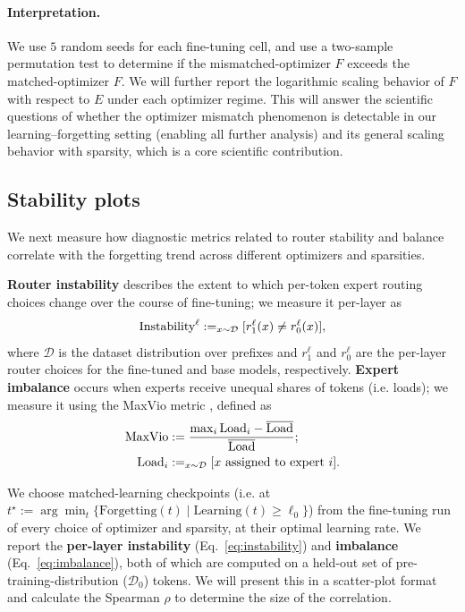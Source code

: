 \documentclass[11pt,a4paper]{article}
\let\Pr\relax
\DeclareMathOperator*{\Pr}{\mathbb{P}}
\newcommand{\D}{\mathcal{D}}
\begin{document}
\paragraph{Interpretation.} We use $5$ random seeds for each fine-tuning cell, and use a two-sample permutation test to determine if the mismatched-optimizer $F$ exceeds the matched-optimizer $F$. We will further report the logarithmic scaling behavior of $F$ with respect to $E$ under each optimizer regime. This will answer the scientific questions of whether the optimizer mismatch phenomenon is detectable in our learning--forgetting setting (enabling all further analysis) and its general scaling behavior with sparsity, which is a core scientific contribution.

\subsection{Stability plots}
\label{sec:3.2}
We next measure how diagnostic metrics related to router stability and balance correlate with the forgetting trend across different optimizers and sparsities.

\textbf{Router instability} describes the extent to which per-token expert routing choices change over the course of fine-tuning; we measure it per-layer as
\begin{equation} \label{eq:instability}
    \textrm{Instability}^\ell := \Pr_{x \sim \mathcal{D}}[r^\ell_1(x) \neq r^\ell_0(x)],
\end{equation}
where $\mathcal{D}$ is the dataset distribution over prefixes and $r^\ell_1$ and $r^\ell_0$ are the per-layer router choices for the fine-tuned and base models, respectively. \textbf{Expert imbalance} occurs when experts receive unequal shares of tokens (i.e. loads); we measure it using the MaxVio metric \cite{wang2024auxiliarylossfreeloadbalancingstrategy}, defined as 
\begin{equation} \label{eq:imbalance}
\begin{aligned} 
    \text{MaxVio} &:= \dfrac{\max_i \text{Load}_i - \overline{\text{Load}}}{\overline{\text{Load}}}; \\ \text{Load}_i &:= \Pr_{x \sim \mathcal{D}} [x \text{ assigned to expert } i].
\end{aligned}
\end{equation}

We choose matched-learning checkpoints (i.e. at $t^\star := \arg \min_t \{\text{Forgetting}(t) \mid \text{Learning}(t) \geq \ell_0\}$) from the fine-tuning run of every choice of optimizer and sparsity, at their optimal learning rate. We report the \textbf{per-layer instability} (Eq.~\ref{eq:instability}) and \textbf{imbalance} (Eq.~\ref{eq:imbalance}), both of which are computed on a held-out set of pre-training-distribution ($\D_0$) tokens. We will present this in a scatter-plot format and calculate the Spearman $\rho$ to determine the size of the correlation.
\end{document}
